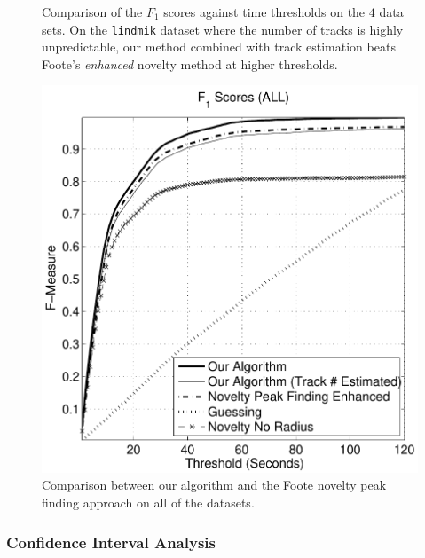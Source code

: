 \documentclass[twocolumn]{article}
\begin{document}
\begin{figure}
\begin{center}
	\end{center}
	
	\caption{Comparison of the $F_1$ scores against time thresholds on the $4$ data sets. On the \texttt{lindmik} dataset where the number of tracks is highly unpredictable, our method combined with track estimation beats Foote's \textit{enhanced} novelty method at higher thresholds.}
	\label{fig:fscores_breakdown}
		
\end{figure}


\begin{figure}
	
		\begin{center}
			\includegraphics[scale=0.5]{images/fscores/fall}
		\end{center}

	\caption{Comparison between our algorithm and the Foote novelty peak finding approach on all of the datasets.}
	\label{fig:fscores_best}
	
\end{figure}

\subsubsection{Confidence Interval Analysis}
\end{document}
